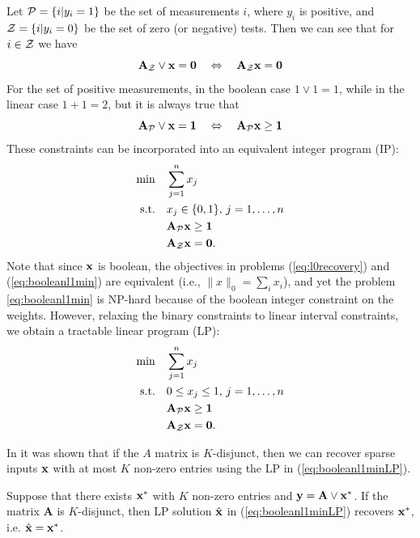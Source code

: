 Let $\mathcal{P}= \{i | y_i = 1\}$ be the set of measurements $i$, where $y_i$ is positive,
and $\mathcal{Z} = \{i | y_i = 0\}$ be the set of zero (or negative) tests. Then we can
see that for $i \in \mathcal{Z}$ we have
\begin{equation}
\mathbf{A}_{\mathcal{Z}}\lor\mathbf{x} = \mathbf{0} ~~~\Leftrightarrow~~~ \mathbf{A}_{\mathcal{Z}}\mathbf{x} = \mathbf{0}
\end{equation}
For the set of positive measurements, in the boolean case $1\lor 1 = 1$, while
in the linear case $1 + 1 = 2$, but it is always true that
\begin{equation}
\mathbf{A}_{\mathcal{P}}\lor\mathbf{x} =\mathbf{1} ~~~\Leftrightarrow~~~ \mathbf{A}_{\mathcal{P}}\mathbf{x} \ge \mathbf{1}
\end{equation}
These constraints can be incorporated into an equivalent integer program (IP):
\begin{align}
\label{eq:booleanl1min}
	\min\quad &\sum_{j=1}^{n} x_j \\
	\textrm{s.t.\quad} & x_j \in \{0,1\},\,j = 1,\ldots,n\nonumber\\
		& \mathbf{A}_{\mathcal{P}}\mathbf{x} \ge \mathbf{1}\nonumber\\
		& \mathbf{A}_{\mathcal{Z}}\mathbf{x} = \mathbf{0}.\nonumber
\end{align}
Note that since $\mathbf{x}$ is boolean, the objectives in problems (\ref{eq:l0recovery}) and (\ref{eq:booleanl1min}) are equivalent (i.e., $\|x\|_0=\sum_i{x_i}$), and yet the problem
\eqref{eq:booleanl1min} is NP-hard because of the boolean integer constraint on the weights. However, relaxing the binary constraints to linear interval constraints, we obtain a tractable linear program (LP):
\begin{align}
\label{eq:booleanl1minLP}
	\min\quad &\sum_{j=1}^{n} x_j \\
	\textrm{s.t.\quad} & 0\leq x_j \leq 1, \,j = 1,\ldots,n\nonumber\\
		& \mathbf{A}_{\mathcal{P}}\mathbf{x} \ge \mathbf{1}\nonumber\\
		& \mathbf{A}_{\mathcal{Z}}\mathbf{x} = \mathbf{0}.\nonumber
\end{align}

In \cite{MalioutovM2012} it was shown that if the $A$ matrix is $K$-disjunct, 
then we can recover sparse inputs $\mathbf{x}$ with at most $K$ non-zero entries using 
the LP in (\ref{eq:booleanl1minLP}).
\begin{theorem}
\label{thm:LP_recovery}
Suppose that there exists $\mathbf{x}^*$ with $K$ non-zero entries and
$\mathbf{y} = \mathbf{A} \lor \mathbf{x}^*$. If the matrix $\mathbf{A}$ is $K$-disjunct, then
LP solution $\hat{\mathbf{x}}$ in (\ref{eq:booleanl1minLP}) recovers $\mathbf{x}^*$, i.e. $\hat{\mathbf{x}} = \mathbf{x}^*$.
\end{theorem}

